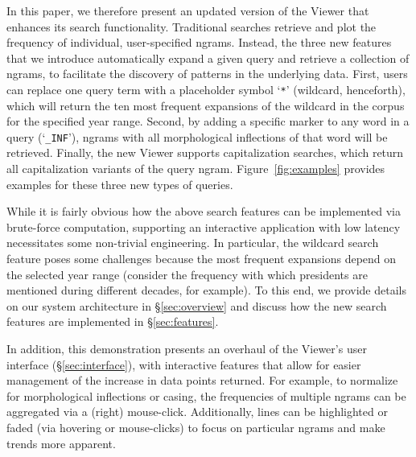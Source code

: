 \documentclass[11pt,a4paper]{article}
\newcommand{\query}[1]{\texttt{#1}}
\begin{document}
In this paper, we therefore present an updated version of the Viewer that enhances its search functionality. Traditional searches retrieve and plot the frequency of individual, user-specified ngrams. Instead, the three new features that we introduce automatically expand a given query and retrieve a collection of ngrams, to facilitate the discovery of patterns in the underlying data. First, users can replace one query term with a placeholder symbol `\query{*}' (wildcard, henceforth), which will return the ten most frequent expansions of the wildcard in the corpus for the specified year range. 
Second, by adding a specific marker to any word in a query (`\query{\_INF}'), ngrams with all morphological inflections of that word will be retrieved. 
Finally, the new Viewer supports capitalization searches, which return all capitalization variants of the query ngram. Figure~\ref{fig:examples} provides examples for these three new types of queries.

While it is fairly obvious how the above search features can be implemented via brute-force computation, supporting an interactive application with low latency necessitates some non-trivial engineering. In particular, the wildcard search feature poses some challenges because the most frequent expansions depend on the selected year range (consider the frequency with which presidents are mentioned during different decades, for example). To this end, we provide details on our system architecture in \S\ref{sec:overview}  and discuss how the new search features are implemented in \S\ref{sec:features}.

In addition, this demonstration presents an overhaul of the Viewer's user interface (\S\ref{sec:interface}), with interactive features that allow for easier management of the increase in data points returned. For example, to normalize for morphological inflections or casing, the frequencies of multiple ngrams can be aggregated via a (right) mouse-click. Additionally, lines can be highlighted or faded (via hovering or mouse-clicks) to focus on particular ngrams and make trends more apparent.
\end{document}
